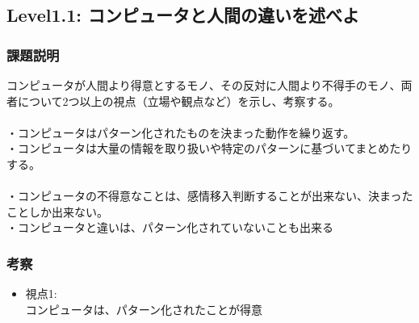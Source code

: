 \subsection{Level1.1: コンピュータと人間の違いを述べよ}
\subsubsection{課題説明}
コンピュータが人間より得意とするモノ、その反対に人間より不得手のモノ、両者について2つ以上の視点（立場や観点など）を示し、考察する。\\
\\
・コンピュータはパターン化されたものを決まった動作を繰り返す。\\
・コンピュータは大量の情報を取り扱いや特定のパターンに基づいてまとめたりする。\\
\\
・コンピュータの不得意なことは、感情移入判断することが出来ない、決まったことしか出来ない。\\
・コンピュータと違いは、パターン化されていないことも出来る
\subsubsection{考察}
\begin{itemize}
 \item 視点1: \\
コンピュータは、パターン化されたことが得意\\
\end{itemize}

